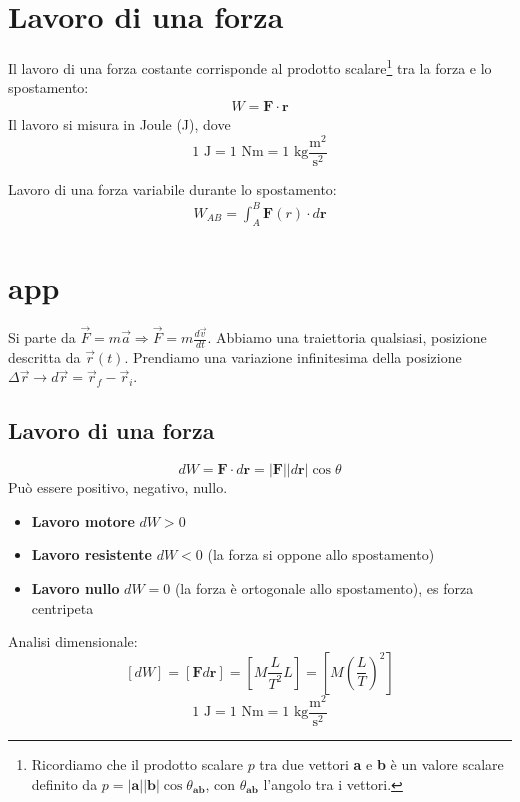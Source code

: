 \marginpar{\minitoc}

\section{Lavoro di una forza}


Il lavoro di una forza costante corrisponde al prodotto scalare\footnote{Ricordiamo
che il prodotto scalare $p$ tra due vettori \textbf{a} e \textbf{b} è un valore scalare
definito da $p = |\textbf{a}||\textbf{b}|\cos\theta_{\textbf{ab}}$, con $\theta_\textbf{ab}$
l'angolo tra i vettori.}
tra la forza e lo spostamento:
\begin{align}
W = \textbf{F}\cdot\textbf{r}
\end{align}
Il lavoro si misura in Joule (J), dove
\[ 1\text{ J} = 1\text{ Nm} = 1\text{ kg$\frac{\text{m}^2}{\text{s}^2}$} \]


Lavoro di una forza variabile durante lo spostamento:
\begin{align}
    W_{AB} = \int_{A}^{B}\textbf{F}(r)\cdot d\textbf{r}
\end{align}

\section*{app}
Si parte da $\overrightarrow{F} = m\overrightarrow{a} \Rightarrow
\overrightarrow{F} = m\frac{d\overrightarrow{v}}{dt}$. Abbiamo una traiettoria
qualsiasi, posizione descritta da $\overrightarrow{r}(t)$. Prendiamo una variazione
infinitesima della posizione $\Delta\overrightarrow{r}\to d\overrightarrow{r} =
\overrightarrow{r}_f - \overrightarrow{r}_i$.

\subsection{Lavoro di una forza}
\[ dW = \textbf{F}\cdot d\textbf{r} = |\textbf{F}||d\textbf{r}|\cos\theta \]
Può essere positivo, negativo, nullo.
\begin{itemize}
    \item \textbf{Lavoro motore} $dW > 0$
    \item \textbf{Lavoro resistente} $dW < 0$ (la forza si oppone allo spostamento)
    \item \textbf{Lavoro nullo} $dW = 0$ (la forza è ortogonale allo spostamento),
    es forza centripeta
\end{itemize}

Analisi dimensionale:
\[ \left[dW\right] = \left[\textbf{F}d\textbf{r}\right] = \left[M\frac{L}{T^2}L\right] = \left[M\left(\frac{L}{T}\right)^2\right] \]
\[ 1\text{ J} = 1\text{ Nm} = 1\text{ kg$\frac{\text{m}^2}{\text{s}^2}$} \]

